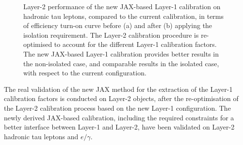 \begin{figure}
    \centering
    \caption{Layer-2 performance of the new JAX-based Layer-1 calibration on hadronic tau leptons, compared to the current calibration, in terms of efficiency turn-on curve before (a) and after (b) applying the isolation requirement. The Layer-2 calibration procedure is re-optimised to account for the different Layer-1 calibration factors. The new JAX-based Layer-1 calibration provides better results in the non-isolated case, and comparable results in the isolated case, with respect to the current configuration.}
    \label{fig:JAX_Layer2_Taus}
\end{figure}

The real validation of the new JAX method for the extraction of the Layer-1 calibration factors is conducted on Layer-2 objects, after the re-optimisation of the Layer-2 calibration process based on the new Layer-1 configuration. 
The newly derived JAX-based calibration, including the required constraints for a better interface between Layer-1 and Layer-2, have been validated on Layer-2 hadronic tau leptons and $e/\gamma$. 

